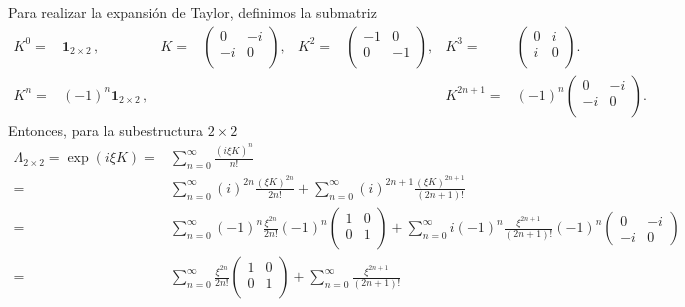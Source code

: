 \begin{frame}
Para realizar la expansión de Taylor, definimos la submatriz
\begin{align*}
  K^{0}=&\boldsymbol{1}_{2\times2}\,,&K=&
  \begin{pmatrix}
   0 &-i\\ %
   -i &0\\  %
  \end{pmatrix},&K^{2}=&  \begin{pmatrix}
   -1 &0\\
   0 &-1\\ 
  \end{pmatrix},&K^{3}=&  \begin{pmatrix}
   0 &i\\
   i &0\\ 
  \end{pmatrix}. \nonumber\\
  K^{n}=&(-1)^{n}\boldsymbol{1}_{2\times2}\,,&&
&&&K^{2n+1}=& (-1)^{n} \begin{pmatrix}
   0 &-i\\
   -i &0\\ 
  \end{pmatrix}. 
\end{align*}
Entonces, para la subestructura $2\times 2$
\begin{align}
  \Lambda_{2\times2}=\exp \left( i \xi K \right)=&\sum_{n=0}^{\infty}\frac{\left(i \xi K \right)^{n}}{n!}\nonumber\\
=&\sum_{n=0}^{\infty}(i)^{2n}\frac{\left( \xi K \right)^{2n}}{2n!}+\sum_{n=0}^{\infty}(i)^{2n+1}\frac{\left( \xi K \right)^{2n+1}}{(2n+1)!}\nonumber\\
  =&\sum_{n=0}^{\infty}(-1)^{n}\frac{\xi^{2n}}{2n!}(-1)^{n}
  \begin{pmatrix}
    1 & 0\\
    0 & 1\\
  \end{pmatrix}
+\sum_{n=0}^{\infty}i(-1)^{n}\frac{ \xi^{2n+1}}{(2n+1)!} (-1)^{n}
\begin{pmatrix}
  0 & -i \\
  -i & 0
\end{pmatrix} 
\nonumber\\
  =&\sum_{n=0}^{\infty}\frac{\xi^{2n}}{2n!}
  \begin{pmatrix}
    1 & 0\\
    0 & 1\\
  \end{pmatrix}
+\sum_{n=0}^{\infty}\frac{ \xi^{2n+1}}{(2n+1)!} 

\end{align}
\end{frame}
